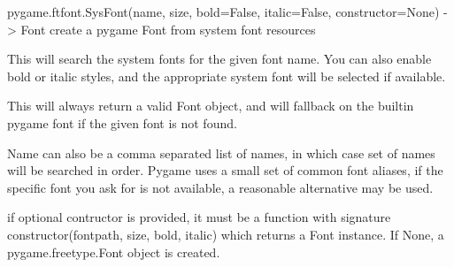 \begin{DoxyVerb}pygame.ftfont.SysFont(name, size, bold=False, italic=False, constructor=None) -> Font
   create a pygame Font from system font resources

   This will search the system fonts for the given font
   name. You can also enable bold or italic styles, and
   the appropriate system font will be selected if available.

   This will always return a valid Font object, and will
   fallback on the builtin pygame font if the given font
   is not found.

   Name can also be a comma separated list of names, in
   which case set of names will be searched in order. Pygame
   uses a small set of common font aliases, if the specific
   font you ask for is not available, a reasonable alternative
   may be used.

   if optional contructor is provided, it must be a function with
   signature constructor(fontpath, size, bold, italic) which returns
   a Font instance. If None, a pygame.freetype.Font object is created.
\end{DoxyVerb}
 